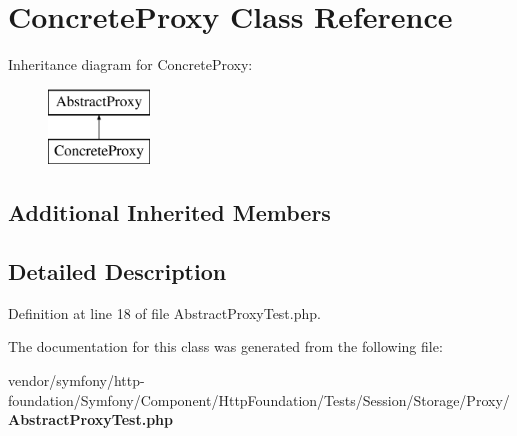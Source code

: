 \section{Concrete\+Proxy Class Reference}
\label{class_symfony_1_1_component_1_1_http_foundation_1_1_tests_1_1_session_1_1_storage_1_1_proxy_1_1_concrete_proxy}
Inheritance diagram for Concrete\+Proxy\+:\begin{figure}[H]
\begin{center}
\leavevmode
\includegraphics[height=2.000000cm]{class_symfony_1_1_component_1_1_http_foundation_1_1_tests_1_1_session_1_1_storage_1_1_proxy_1_1_concrete_proxy}
\end{center}
\end{figure}
\subsection*{Additional Inherited Members}


\subsection{Detailed Description}


Definition at line 18 of file Abstract\+Proxy\+Test.\+php.



The documentation for this class was generated from the following file\+:\begin{DoxyCompactItemize}
\item 
vendor/symfony/http-\/foundation/\+Symfony/\+Component/\+Http\+Foundation/\+Tests/\+Session/\+Storage/\+Proxy/{\bf Abstract\+Proxy\+Test.\+php}\end{DoxyCompactItemize}
